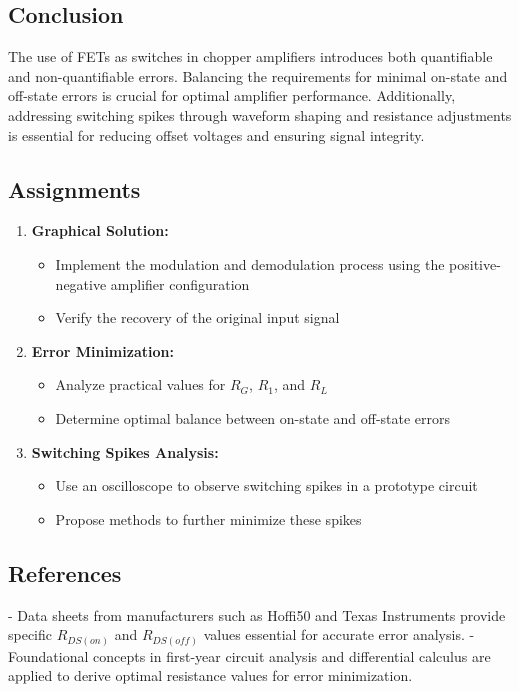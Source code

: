\subsection*{Conclusion}
The use of FETs as switches in chopper amplifiers introduces both quantifiable and non-quantifiable errors. Balancing the requirements for minimal on-state and off-state errors is crucial for optimal amplifier performance. Additionally, addressing switching spikes through waveform shaping and resistance adjustments is essential for reducing offset voltages and ensuring signal integrity.

\subsection*{Assignments}
\begin{enumerate}
    \item \textbf{Graphical Solution:} 
        \begin{itemize}
            \item Implement the modulation and demodulation process using the positive-negative amplifier configuration
            \item Verify the recovery of the original input signal
        \end{itemize}
    
    \item \textbf{Error Minimization:}
        \begin{itemize} 
            \item Analyze practical values for \( R_G \), \( R_1 \), and \( R_L \)
            \item Determine optimal balance between on-state and off-state errors
        \end{itemize}
        
    \item \textbf{Switching Spikes Analysis:}
        \begin{itemize}
            \item Use an oscilloscope to observe switching spikes in a prototype circuit
            \item Propose methods to further minimize these spikes
        \end{itemize}
\end{enumerate}
\subsection*{References}
- Data sheets from manufacturers such as Hoffi50 and Texas Instruments provide specific \( R_{DS(on)} \) and \( R_{DS(off)} \) values essential for accurate error analysis.
- Foundational concepts in first-year circuit analysis and differential calculus are applied to derive optimal resistance values for error minimization.

